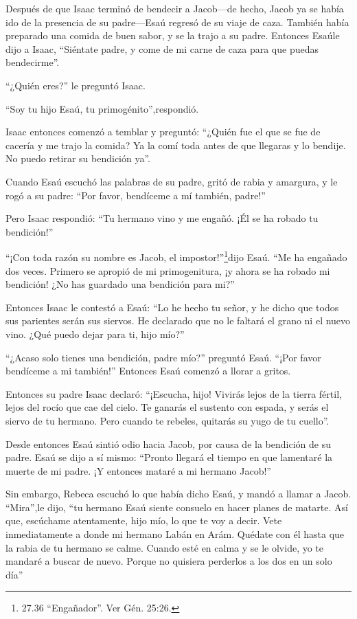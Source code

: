  Después de que Isaac terminó de bendecir a Jacob---de
hecho, Jacob ya se había ido de la presencia de su padre---Esaú regresó
de su viaje de caza.  También había preparado una comida de
buen sabor, y se la trajo a su padre. Entonces Esaúle dijo a Isaac,
``Siéntate padre, y come de mi carne de caza para que puedas
bendecirme''.

 ``¿Quién eres?'' le preguntó Isaac.

``Soy tu hijo Esaú, tu primogénito'',respondió.

 Isaac entonces comenzó a temblar y preguntó: ``¿Quién fue
el que se fue de cacería y me trajo la comida? Ya la comí toda antes de
que llegaras y lo bendije. No puedo retirar su bendición ya''.

 Cuando Esaú escuchó las palabras de su padre, gritó de
rabia y amargura, y le rogó a su padre: ``Por favor, bendíceme a mí
también, padre!''

 Pero Isaac respondió: ``Tu hermano vino y me engañó. ¡Él
se ha robado tu bendición!''

 ``¡Con toda razón su nombre es Jacob, el
impostor!''\footnote{27.36 ``Engañador''. Ver Gén. 25:26.}dijo Esaú.
``Me ha engañado dos veces. Primero se apropió de mi primogenitura, ¡y
ahora se ha robado mi bendición! ¿No has guardado una bendición para
mi?''

 Entonces Isaac le contestó a Esaú: ``Lo he hecho tu señor,
y he dicho que todos sus parientes serán sus siervos. He declarado que
no le faltará el grano ni el nuevo vino. ¿Qué puedo dejar para ti, hijo
mío?''

 ``¿Acaso solo tienes una bendición, padre mío?'' preguntó
Esaú. ``¡Por favor bendíceme a mi también!'' Entonces Esaú comenzó a
llorar a gritos.

 Entonces su padre Isaac declaró: ``¡Escucha, hijo! Vivirás
lejos de la tierra fértil, lejos del rocío que cae del cielo.
 Te ganarás el sustento con espada, y serás el siervo de tu
hermano. Pero cuando te rebeles, quitarás su yugo de tu cuello''.

 Desde entonces Esaú sintió odio hacia Jacob, por causa de
la bendición de su padre. Esaú se dijo a sí mismo: ``Pronto llegará el
tiempo en que lamentaré la muerte de mi padre. ¡Y entonces mataré a mi
hermano Jacob!''

 Sin embargo, Rebeca escuchó lo que había dicho Esaú, y
mandó a llamar a Jacob. ``Mira'',le dijo, ``tu hermano Esaú siente
consuelo en hacer planes de matarte.  Así que, escúchame
atentamente, hijo mío, lo que te voy a decir. Vete inmediatamente a
donde mi hermano Labán en Arám.  Quédate con él hasta que
la rabia de tu hermano se calme.  Cuando esté en calma y se
le olvide, yo te mandaré a buscar de nuevo. Porque no quisiera perderlos
a los dos en un solo día''

